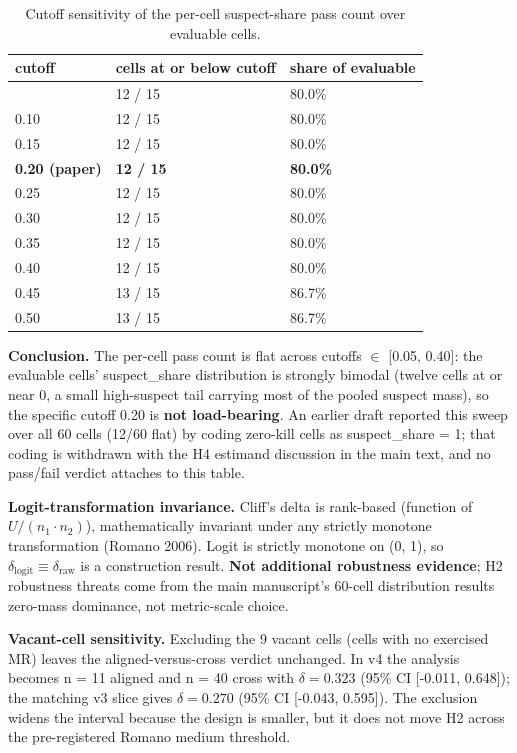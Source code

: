 \documentclass[manuscript,screen,review]{acmart}
\begin{document}
{%
\begin{longtable}[]{@{}lll@{}}
\caption{Cutoff sensitivity of the per-cell suspect-share pass count
over evaluable cells.}\label{tab:p2-22}\\
\toprule\noalign{}
cutoff & cells at or below cutoff & share of evaluable \\
\midrule\noalign{}
\endfirsthead
\endhead
\bottomrule\noalign{}
\endlastfoot
0.05 & 12 / 15 & 80.0\% \\
0.10 & 12 / 15 & 80.0\% \\
0.15 & 12 / 15 & 80.0\% \\
\textbf{0.20 (paper)} & \textbf{12 / 15} & \textbf{80.0\%} \\
0.25 & 12 / 15 & 80.0\% \\
0.30 & 12 / 15 & 80.0\% \\
0.35 & 12 / 15 & 80.0\% \\
0.40 & 12 / 15 & 80.0\% \\
0.45 & 13 / 15 & 86.7\% \\
0.50 & 13 / 15 & 86.7\% \\
\end{longtable}
}

\textbf{Conclusion.} The per-cell pass count is flat across cutoffs
$\in$ {[}0.05, 0.40{]}: the evaluable cells' suspect\_share
distribution is strongly bimodal (twelve cells at or near 0, a small
high-suspect tail carrying most of the pooled suspect mass), so the
specific cutoff 0.20 is \textbf{not load-bearing}. An earlier draft
reported this sweep over all 60 cells (12/60 flat) by coding zero-kill
cells as suspect\_share = 1; that coding is withdrawn with the H4
estimand discussion in the main text, and no pass/fail verdict attaches
to this table.

\textbf{Logit-transformation invariance.} Cliff's delta is rank-based
(function of $U / (n_1 \cdot n_2)$), mathematically invariant under any strictly
monotone transformation (Romano 2006). Logit is strictly monotone on (0,
1), so $\delta_{\mathrm{logit}} \equiv \delta_{\mathrm{raw}}$ is a construction result. \textbf{Not
additional robustness evidence}; H2 robustness threats come from the main manuscript's 60-cell distribution results
zero-mass dominance, not metric-scale choice.

\textbf{Vacant-cell sensitivity.} Excluding the 9 vacant cells (cells
with no exercised MR) leaves the aligned-versus-cross verdict unchanged.
In v4 the analysis becomes n = 11 aligned and n = 40 cross with
$\delta = 0.323$ (95\% CI [-0.011, 0.648]); the matching v3 slice gives
$\delta = 0.270$ (95\% CI [-0.043, 0.595]). The exclusion widens the
interval because the design is smaller, but it does not move H2 across
the pre-registered Romano medium threshold.
\end{document}
